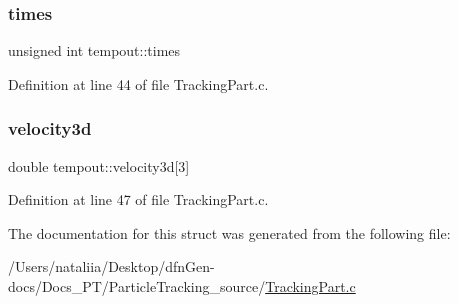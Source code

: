 \subsubsection{\texorpdfstring{times}{times}}
{\footnotesize\ttfamily unsigned int tempout\+::times}



Definition at line 44 of file Tracking\+Part.\+c.

\mbox{\label{structtempout_abc348407152ab976840ee50d46164a83}} 
\subsubsection{\texorpdfstring{velocity3d}{velocity3d}}
{\footnotesize\ttfamily double tempout\+::velocity3d\mbox{[}3\mbox{]}}



Definition at line 47 of file Tracking\+Part.\+c.



The documentation for this struct was generated from the following file\+:\begin{DoxyCompactItemize}
\item 
/\+Users/nataliia/\+Desktop/dfn\+Gen-\/docs/\+Docs\+\_\+\+P\+T/\+Particle\+Tracking\+\_\+source/\mbox{\hyperlink{_tracking_part_8c}{Tracking\+Part.\+c}}\end{DoxyCompactItemize}
